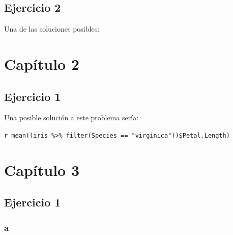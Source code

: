 \documentclass[]{book}
\newenvironment{Shaded}{\begin{snugshade}}{\end{snugshade}}
\newcommand{\DataTypeTok}[1]{\textcolor[rgb]{0.13,0.29,0.53}{#1}}
\newcommand{\DecValTok}[1]{\textcolor[rgb]{0.00,0.00,0.81}{#1}}
\newcommand{\FloatTok}[1]{\textcolor[rgb]{0.00,0.00,0.81}{#1}}
\newcommand{\KeywordTok}[1]{\textcolor[rgb]{0.13,0.29,0.53}{\textbf{#1}}}
\newcommand{\NormalTok}[1]{#1}
\newcommand{\OperatorTok}[1]{\textcolor[rgb]{0.81,0.36,0.00}{\textbf{#1}}}
\newcommand{\StringTok}[1]{\textcolor[rgb]{0.31,0.60,0.02}{#1}}
\begin{document}
\hypertarget{ejercicio-2-2}{%
\subsection{Ejercicio 2}\label{ejercicio-2-2}}

Una de las soluciones posibles:

\begin{Shaded}
\end{Shaded}

\hypertarget{capitulo-2}{%
\section{Capítulo 2}\label{capitulo-2}}

\hypertarget{ejercicio-1-4}{%
\subsection{Ejercicio 1}\label{ejercicio-1-4}}

Una posible solución a este problema sería:

\texttt{\textasciigrave{}r\ mean((iris\ \%\textgreater{}\%\ filter(Species\ ==\ "virginica"))\$Petal.Length)\textasciigrave{}}

\hypertarget{capitulo-3}{%
\section{Capítulo 3}\label{capitulo-3}}

\hypertarget{ejercicio-1-5}{%
\subsection{Ejercicio 1}\label{ejercicio-1-5}}

\hypertarget{a}{%
\subsubsection{a}\label{a}}
\end{document}
